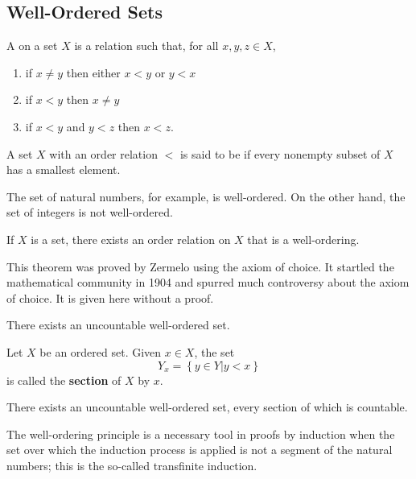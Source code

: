 \subsection{Well-Ordered Sets}

A  on a set $X$ is a relation such that, for all $x, y, z \in X$,
\begin{enumerate}
\item if $x \neq y$ then either $x < y$ or $y < x$
\item if $x < y$ then $x \neq y$
\item if $x < y$ and $y < z$ then $x < z$.
\end{enumerate}

\begin{definition}
A set $X$ with an order relation $<$ is said to be  if every nonempty subset of $X$ has a smallest element.
\end{definition}

The set of natural numbers, for example, is well-ordered.
On the other hand, the set of integers is not well-ordered.

\begin{fact}
If $X$ is a set, there exists an order relation on $X$ that is a well-ordering.
\end{fact}

This theorem was proved by Zermelo using the axiom of choice.
It startled the mathematical community in 1904 and spurred much controversy about the axiom of choice.
It is given here without a proof.

\begin{corollary}
There exists an uncountable well-ordered set.
\end{corollary}

\begin{definition}
Let $X$ be an ordered set.
Given $x \in X$, the set
\begin{equation*}
Y_x = \left\{ y \in Y | y < x \right\}
\end{equation*}
is called the \textbf{section} of $X$ by $x$.
\end{definition}

\begin{corollary}
There exists an uncountable well-ordered set, every section of which is countable.
\end{corollary}

The well-ordering principle is a necessary tool in proofs by induction when the set over which the induction process is applied is not a segment of the natural numbers; this is the so-called transfinite induction.


